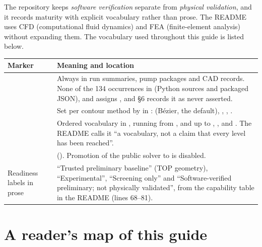 The repository keeps \emph{software verification} separate from \emph{physical validation}, and it records maturity with explicit vocabulary rather than prose. The README uses CFD (computational fluid dynamics) and FEA (finite-element analysis) without expanding them. The vocabulary used throughout this guide is listed below.

{\small
\begin{longtable}{P{3.7cm}P{11.7cm}}
\toprule
Marker & Meaning and location \\
\midrule
\endhead
{} & Always  in run summaries, pump packages and CAD records. None of the 134 occurrences in  (Python sources and packaged JSON),  and  assigns , and  §6 records it as never asserted. \\
 & Set per contour method by  in :  (B\'ezier, the default), , , . \\
 & Ordered vocabulary in , running from ,  and  up to , ,  and . The README calls it ``a vocabulary, not a claim that every level has been reached''. \\
 &  (). Promotion of the public solver to  is disabled. \\
Readiness labels in prose & ``Trusted preliminary baseline'' (TOP geometry), ``Experimental'', ``Screening only'' and ``Software-verified preliminary; not physically validated'', from the capability table in the README (lines 68--81). \\
\bottomrule
\end{longtable}}

\section{A reader's map of this guide}\label{sec:orient-map}

